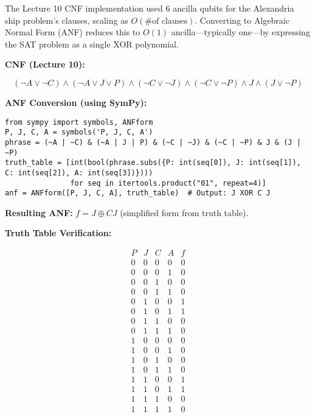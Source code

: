 The Lecture 10 CNF implementation used 6 ancilla qubits for the Alexandria
ship problem’s clauses, scaling as $O(\text{\# of clauses})$. Converting to
Algebraic Normal Form (ANF) reduces this to $O(1)$ ancilla—typically one—by
expressing the SAT problem as a single XOR polynomial.

\textbf{CNF (Lecture 10):}

\[
  (\neg A \lor \neg C) \land (\neg A \lor J \lor P) \land (\neg C \lor \neg
  J) \land (\neg C \lor \neg P) \land J \land (J \lor \neg P)
\]

\textbf{ANF Conversion (using SymPy):}
\begin{verbatim}
from sympy import symbols, ANFform
P, J, C, A = symbols('P, J, C, A')
phrase = (~A | ~C) & (~A | J | P) & (~C | ~J) & (~C | ~P) & J & (J | ~P)
truth_table = [int(bool(phrase.subs({P: int(seq[0]), J: int(seq[1]), C: int(seq[2]), A: int(seq[3])})))
               for seq in itertools.product("01", repeat=4)]
anf = ANFform([P, J, C, A], truth_table)  # Output: J XOR C J
\end{verbatim}

\textbf{Resulting ANF:} $f = J \oplus C J$ (simplified form from truth table).

\textbf{Truth Table Verification:}

\[
  \begin{array}{cccc|c}
    P & J & C & A & f \\
    \hline
    0 & 0 & 0 & 0 & 0 \\
    0 & 0 & 0 & 1 & 0 \\
    0 & 0 & 1 & 0 & 0 \\
    0 & 0 & 1 & 1 & 0 \\
    0 & 1 & 0 & 0 & 1 \\
    0 & 1 & 0 & 1 & 1 \\
    0 & 1 & 1 & 0 & 0 \\
    0 & 1 & 1 & 1 & 0 \\
    1 & 0 & 0 & 0 & 0 \\
    1 & 0 & 0 & 1 & 0 \\
    1 & 0 & 1 & 0 & 0 \\
    1 & 0 & 1 & 1 & 0 \\
    1 & 1 & 0 & 0 & 1 \\
    1 & 1 & 0 & 1 & 1 \\
    1 & 1 & 1 & 0 & 0 \\
    1 & 1 & 1 & 1 & 0 \\
  \end{array}
\]


